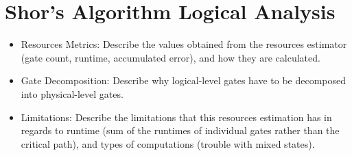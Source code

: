 %
%
\chapter {Shor's Algorithm Logical Analysis}

\begin{itemize}
    \item Resources Metrics: Describe the values obtained from the resources estimator (gate count, runtime, accumulated error), and how they are calculated.
    \item Gate Decomposition: Describe why logical-level gates have to be decomposed into physical-level gates.
    \item Limitations: Describe the limitations that this resources estimation has in regards to runtime (sum of the runtimes of individual gates rather than the critical path), and types of computations (trouble with mixed states).
\end{itemize}